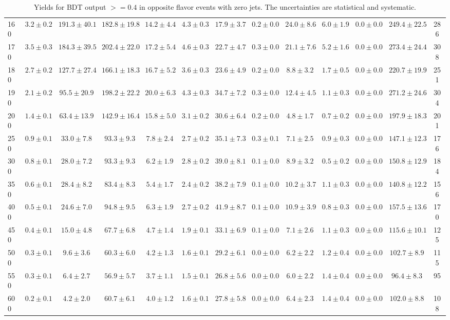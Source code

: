 \begin{table}
{\begin{center}
\begin{tabular}{l | c c | c c c c c c c c  | c c}
160 & $3.2\pm0.2$ & $191.3\pm40.1$ & $182.8\pm19.8$ & $14.2\pm4.4$ & $4.3\pm0.3$ & $17.9\pm3.7$ & $0.2\pm0.0$ & $24.0\pm8.6$ & $6.0\pm1.9$ & $0.0\pm0.0$ & $249.4\pm22.5$ & 286 \\
170 & $3.5\pm0.3$ & $184.3\pm39.5$ & $202.4\pm22.0$ & $17.2\pm5.4$ & $4.6\pm0.3$ & $22.7\pm4.7$ & $0.3\pm0.0$ & $21.1\pm7.6$ & $5.2\pm1.6$ & $0.0\pm0.0$ & $273.4\pm24.4$ & 308 \\
180 & $2.7\pm0.2$ & $127.7\pm27.4$ & $166.1\pm18.3$ & $16.7\pm5.2$ & $3.6\pm0.3$ & $23.6\pm4.9$ & $0.2\pm0.0$ & $8.8\pm3.2$ & $1.7\pm0.5$ & $0.0\pm0.0$ & $220.7\pm19.9$ & 251 \\
190 & $2.1\pm0.2$ & $95.5\pm20.9$ & $198.2\pm22.2$ & $20.0\pm6.3$ & $4.3\pm0.3$ & $34.7\pm7.2$ & $0.3\pm0.0$ & $12.4\pm4.5$ & $1.1\pm0.3$ & $0.0\pm0.0$ & $271.2\pm24.6$ & 304 \\
200 & $1.4\pm0.1$ & $63.4\pm13.9$ & $142.9\pm16.4$ & $15.8\pm5.0$ & $3.1\pm0.2$ & $30.6\pm6.4$ & $0.2\pm0.0$ & $4.8\pm1.7$ & $0.7\pm0.2$ & $0.0\pm0.0$ & $197.9\pm18.3$ & 201 \\
250 & $0.9\pm0.1$ & $33.0\pm7.8$ & $93.3\pm9.3$ & $7.8\pm2.4$ & $2.7\pm0.2$ & $35.1\pm7.3$ & $0.3\pm0.1$ & $7.1\pm2.5$ & $0.9\pm0.3$ & $0.0\pm0.0$ & $147.1\pm12.3$ & 176 \\
300 & $0.8\pm0.1$ & $28.0\pm7.2$ & $93.3\pm9.3$ & $6.2\pm1.9$ & $2.8\pm0.2$ & $39.0\pm8.1$ & $0.1\pm0.0$ & $8.9\pm3.2$ & $0.5\pm0.2$ & $0.0\pm0.0$ & $150.8\pm12.9$ & 184 \\
350 & $0.6\pm0.1$ & $28.4\pm8.2$ & $83.4\pm8.3$ & $5.4\pm1.7$ & $2.4\pm0.2$ & $38.2\pm7.9$ & $0.1\pm0.0$ & $10.2\pm3.7$ & $1.1\pm0.3$ & $0.0\pm0.0$ & $140.8\pm12.2$ & 156 \\
400 & $0.5\pm0.1$ & $24.6\pm7.0$ & $94.8\pm9.5$ & $6.3\pm1.9$ & $2.7\pm0.2$ & $41.9\pm8.7$ & $0.1\pm0.0$ & $10.9\pm3.9$ & $0.8\pm0.3$ & $0.0\pm0.0$ & $157.5\pm13.6$ & 170 \\
450 & $0.4\pm0.1$ & $15.0\pm4.8$ & $67.7\pm6.8$ & $4.7\pm1.4$ & $1.9\pm0.1$ & $33.1\pm6.9$ & $0.1\pm0.0$ & $7.1\pm2.6$ & $1.1\pm0.3$ & $0.0\pm0.0$ & $115.6\pm10.1$ & 125 \\
500 & $0.3\pm0.1$ & $9.6\pm3.6$ & $60.3\pm6.0$ & $4.2\pm1.3$ & $1.6\pm0.1$ & $29.2\pm6.1$ & $0.0\pm0.0$ & $6.2\pm2.2$ & $1.2\pm0.4$ & $0.0\pm0.0$ & $102.7\pm8.9$ & 115 \\
550 & $0.3\pm0.1$ & $6.4\pm2.7$ & $56.9\pm5.7$ & $3.7\pm1.1$ & $1.5\pm0.1$ & $26.8\pm5.6$ & $0.0\pm0.0$ & $6.0\pm2.2$ & $1.4\pm0.4$ & $0.0\pm0.0$ & $96.4\pm8.3$ & 95 \\
600 & $0.2\pm0.1$ & $4.2\pm2.0$ & $60.7\pm6.1$ & $4.0\pm1.2$ & $1.6\pm0.1$ & $27.8\pm5.8$ & $0.0\pm0.0$ & $6.4\pm2.3$ & $1.4\pm0.4$ & $0.0\pm0.0$ & $102.0\pm8.8$ & 108 \\
\hline
\end{tabular}
\end{center}
\label{tab:yields_bdthi_0j}
\caption{Yields for BDT output $>=0.4$ in opposite flavor events with zero jets. The uncertainties are statistical and systematic.}}
\end{table}

